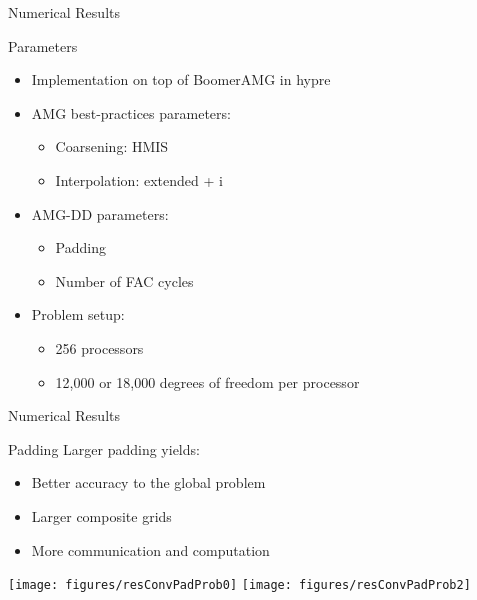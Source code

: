 \documentclass[18pt,xcolor=table]{beamer}
\begin{document}
\begin{frame}{Numerical Results}
\begin{block}{Parameters}
\begin{itemize}
\item Implementation on top of BoomerAMG in hypre
\item AMG best-practices parameters:
\begin{itemize}
   \item Coarsening: HMIS
   \item Interpolation: extended + i
\end{itemize}
\item AMG-DD parameters:
\begin{itemize}
   \item Padding
   \item Number of FAC cycles
\end{itemize}
\item Problem setup:
\begin{itemize}
   \item 256 processors
   \item 12,000 or 18,000 degrees of freedom per processor
\end{itemize}
\end{itemize}
\end{block}

\end{frame}

\begin{frame}{Numerical Results}
\begin{block}{Padding}
Larger padding yields:
\begin{itemize}
   \item Better accuracy to the global problem
   \item Larger composite grids
   \item More communication and computation
\end{itemize}
\end{block}

\centering
\vspace{0.5 cm}
\texttt{[image: figures/resConvPadProb0]}
\texttt{[image: figures/resConvPadProb2]}

\end{frame}
\end{document}
